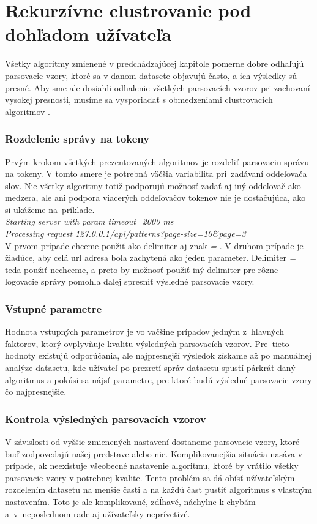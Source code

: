 \chapter{Rekurzívne clustrovanie pod dohľadom užívateľa}

Všetky algoritmy zmienené v predchádzajúcej kapitole pomerne dobre odhaľujú parsovacie vzory, ktoré sa v danom datasete objavujú často, a ich výsledky sú presné. Aby sme ale dosiahli odhalenie všetkých parsovacích vzorov pri zachovaní vysokej presnosti, musíme sa vysporiadať s obmedzeniami clustrovacích algoritmov \parencite{Tovarnak2017}.

\subsection*{Rozdelenie správy na tokeny}
Prvým krokom všetkých prezentovaných algoritmov je rozdeliť parsovaciu správu na tokeny. V tomto smere je potrebná väčšia variabilita pri~zadávaní oddeľovača slov. Nie všetky algoritmy totiž podporujú možnosť zadať aj iný oddeľovač ako medzera, ale ani podpora via\-cerých oddeľovačov tokenov nie je dostačujúca, ako si ukážeme na~príklade. \\

\indent \emph{Starting server with param timeout=2000 ms} \\
\indent \emph{Processing request 127.0.0.1/api/patterns?page-size=10\&page=3} \\

V prvom prípade chceme použiť ako delimiter aj znak \emph{=} . V druhom prípade je žiadúce, aby celá url adresa bola zachytená ako jeden para\-meter. Delimiter \emph{=} teda použiť nechceme, a preto by možnosť použiť iný delimiter pre rôzne logovacie správy pomohla ďalej spresniť výsledné parsovacie vzory.

\subsection*{Vstupné parametre}
Hodnota vstupných parametrov je vo vačšine prípadov jedným z~hlav\-ných faktorov, ktorý ovplyvňuje kvalitu výsledných parsovacích vzorov.
Pre~tieto hodnoty existujú odporúčania, ale najpresnejší výsledok získame až po manuálnej analýze datasetu, kde užívateľ po prezre\-tí správ datasetu spustí párkrát daný algoritmus a pokúsi sa nájsť parametre, pre ktoré budú výsledné parsovacie vzory čo najpresnej\-šie.

\subsection*{Kontrola výsledných parsovacích vzorov}
V závislosti od vyššie zmienených nastavení dostaneme parsovacie vzory, ktoré buď zodpovedajú našej predstave alebo nie. Komplikovanejšia situácia nasáva v prípade, ak neexistuje všeobecné nastavenie algoritmu, ktoré by vrátilo všetky parsovacie vzory v potrebnej kvalite. Tento problém sa dá obísť užívateľským rozdelením datasetu na menšie časti a na každú časť pustiť algoritmus s vlastným nastavením. Toto je ale komplikované, zdĺhavé, náchylne k chybám a~v~ne\-poslednom rade aj užívateľsky neprívetivé.

